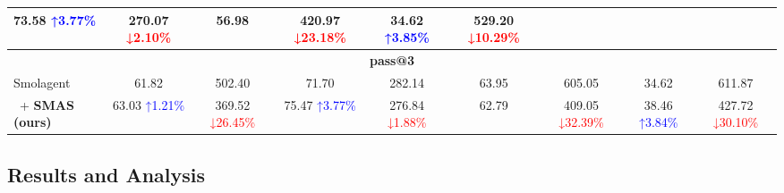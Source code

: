 \begin{table}[!t]
{\begin{tabular}{@{}lcccccccc@{}}
            73.58 {\scriptsize \textcolor{blue}{↑3.77\%}} & 270.07 {\scriptsize \textcolor{red}{↓2.10\%}}  &
            56.98                                         & 420.97 {\scriptsize \textcolor{red}{↓23.18\%}} &
            34.62 {\scriptsize \textcolor{blue}{↑3.85\%}} & 529.20 {\scriptsize \textcolor{red}{↓10.29\%}}                                                                                                                                                                                                                                                                                \\
            \midrule
            \multicolumn{9}{c}{\bf pass@3}                                                                                                                                                                                                                                                                                                                                                \\
            \midrule
            Smolagent                                     & 61.82                                          & 502.40                                         & 71.70                           & 282.14                                & 63.95                           & 605.05                                & 34.62                           & 611.87                                \\
            \, + \textbf{SMAS (ours)}                     & 63.03 {\scriptsize \textcolor{blue}{↑1.21\%}}  & 369.52 {\scriptsize \textcolor{red}{↓26.45\%}} &
            75.47 {\scriptsize \textcolor{blue}{↑3.77\%}} & 276.84 {\scriptsize \textcolor{red}{↓1.88\%}}  &
            62.79                                         & 409.05 {\scriptsize \textcolor{red}{↓32.39\%}} &
            38.46 {\scriptsize \textcolor{blue}{↑3.84\%}} & 427.72 {\scriptsize \textcolor{red}{↓30.10\%}}                                                                                                                                                                                                                                                                                \\
            \bottomrule
        \end{tabular}
    }
\end{table}


\subsection{Results and Analysis}
